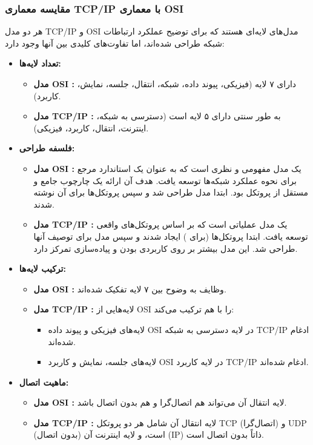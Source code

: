 \subsubsection*{مقایسه معماری TCP/IP با معماری OSI}

هر دو مدل TCP/IP و OSI مدل‌های لایه‌ای هستند که برای توضیح عملکرد ارتباطات شبکه طراحی شده‌اند، اما تفاوت‌های کلیدی بین آنها وجود دارد:

\begin{itemize}
	\item \textbf{تعداد لایه‌ها:}
	\begin{itemize}
		\item \textbf{مدل OSI :} دارای ۷ لایه (فیزیکی، پیوند داده، شبکه، انتقال، جلسه، نمایش، کاربرد).
		\item \textbf{مدل TCP/IP :} به طور سنتی دارای ۵ لایه است (دسترسی به شبکه، اینترنت، انتقال، کاربرد، فیزیکی).
	\end{itemize}
	
	\item \textbf{فلسفه طراحی:}
	\begin{itemize}
		\item \textbf{مدل OSI :} یک مدل مفهومی و نظری است که به عنوان یک استاندارد مرجع برای نحوه عملکرد شبکه‌ها توسعه یافت. هدف آن ارائه یک چارچوب جامع و مستقل از پروتکل بود. ابتدا مدل طراحی شد و سپس پروتکل‌ها برای آن نوشته شدند.
		\item \textbf{مدل TCP/IP :} یک مدل عملیاتی است که بر اساس پروتکل‌های واقعی توسعه یافت. ابتدا پروتکل‌ها (برای ) ایجاد شدند و سپس مدل برای توصیف آنها طراحی شد. این مدل بیشتر بر روی کاربردی بودن و پیاده‌سازی تمرکز دارد.
	\end{itemize}
	
	\item \textbf{ترکیب لایه‌ها:}
	\begin{itemize}
		\item \textbf{مدل OSI :} وظایف به وضوح بین ۷ لایه تفکیک شده‌اند.
		\item \textbf{مدل TCP/IP :} لایه‌هایی از OSI را با هم ترکیب می‌کند:
		\begin{itemize}
			\item لایه‌های فیزیکی و پیوند داده OSI در لایه دسترسی به شبکه TCP/IP ادغام شده‌اند.
			\item لایه‌های جلسه، نمایش و کاربرد OSI در لایه کاربرد TCP/IP ادغام شده‌اند.
		\end{itemize}
	\end{itemize}
	
	\item \textbf{ماهیت اتصال:}
	\begin{itemize}
		\item \textbf{مدل OSI :} لایه انتقال آن می‌تواند هم اتصال‌گرا و هم بدون اتصال باشد.
		\item \textbf{مدل TCP/IP :} لایه انتقال آن شامل هر دو پروتکل TCP (اتصال‌گرا) و UDP (بدون اتصال) است، و لایه اینترنت آن (IP) ذاتاً بدون اتصال است.
	\end{itemize}
	

\end{itemize}
